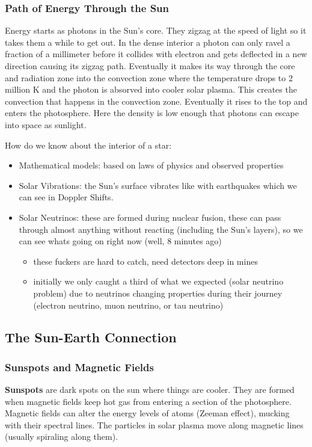 \documentclass[12pt]{article}
\begin{document}
\subsubsection{Path of Energy Through the Sun}
Energy starts as photons in the Sun's core. They zigzag at the speed of light so it takes them a while to get out. In the dense interior a photon can only ravel a fraction of a millimeter before it collides with electron and gets deflected in a new direction causing its zigzag path. Eventually it makes its way through the core and radiation zone into the convection zone where the temperature drops to 2 million K and the photon is absorved into cooler solar plasma. This creates the convection that happens in the convection zone. Eventually it rises to the top and enters the photosphere. Here the density is low enough that photons can escape into space as sunlight.

How do we know about the interior of a star:
\begin{itemize}
\item Mathematical models: based on laws of physics and observed properties
\item Solar Vibrations: the Sun's surface vibrates like with earthquakes which we can see in Doppler Shifts.
\item Solar Neutrinos: these are formed during nuclear fusion, these can pass through almost anything without reacting (including the Sun's layers), so we can see whats going on right now (well, 8 minutes ago)
\begin{itemize}
\item these fuckers are hard to catch, need detectors deep in mines
\item initially we only caught a third of what we expected (solar neutrino problem) due to neutrinos changing properties during their journey (electron neutrino, muon neutrino, or tau neutrino)
\end{itemize}
\end{itemize}

\subsection{The Sun-Earth Connection}
\subsubsection{Sunspots and Magnetic Fields}
\textbf{Sunspots} are dark spots on the sun where things are cooler. They are formed when magnetic fields keep hot gas from entering a section of the photosphere. Magnetic fields can alter the energy levels of atoms (Zeeman effect), mucking with their spectral lines. The particles in solar plasma move along magnetic lines (usually spiraling along them).
\end{document}
